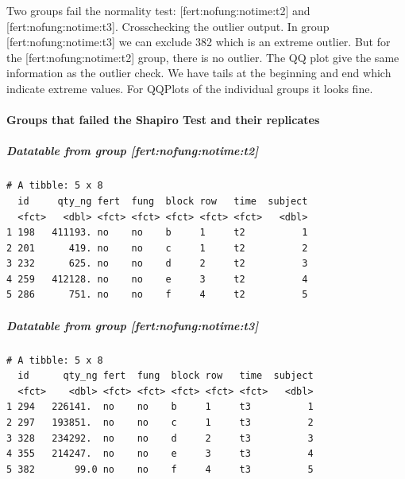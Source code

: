 \documentclass[twoside,12pt,final]{ucthesis-CA2012}
\begin{document}
\begin{ucmainmatter}
Two groups fail the normality test: {[}fert:no\textbar fung:no\textbar time:t2{]} and {[}fert:no\textbar fung:no\textbar time:t3{]}. Crosschecking the outlier output. In group {[}fert:no\textbar fung:no\textbar time:t3{]} we can exclude 382 which is an extreme outlier. But for the {[}fert:no\textbar fung:no\textbar time:t2{]} group, there is no outlier. The QQ plot give the same information as the outlier check. We have tails at the beginning and end which indicate extreme values. For QQPlots of the individual groups it looks fine.

\hypertarget{groups-that-failed-the-shapiro-test-and-their-replicates}{%
\paragraph{Groups that failed the Shapiro Test and their replicates}\label{groups-that-failed-the-shapiro-test-and-their-replicates}}

\hypertarget{datatable-from-group-fertnofungnotimet2}{%
\subparagraph{Datatable from group {[}fert:no\textbar fung:no\textbar time:t2{]}}\label{datatable-from-group-fertnofungnotimet2}}
\begin{verbatim}
# A tibble: 5 x 8
  id     qty_ng fert  fung  block row   time  subject
  <fct>   <dbl> <fct> <fct> <fct> <fct> <fct>   <dbl>
1 198   411193. no    no    b     1     t2          1
2 201      419. no    no    c     1     t2          2
3 232      625. no    no    d     2     t2          3
4 259   412128. no    no    e     3     t2          4
5 286      751. no    no    f     4     t2          5
\end{verbatim}
\hypertarget{datatable-from-group-fertnofungnotimet3}{%
\subparagraph{Datatable from group {[}fert:no\textbar fung:no\textbar time:t3{]}}\label{datatable-from-group-fertnofungnotimet3}}
\begin{verbatim}
# A tibble: 5 x 8
  id      qty_ng fert  fung  block row   time  subject
  <fct>    <dbl> <fct> <fct> <fct> <fct> <fct>   <dbl>
1 294   226141.  no    no    b     1     t3          1
2 297   193851.  no    no    c     1     t3          2
3 328   234292.  no    no    d     2     t3          3
4 355   214247.  no    no    e     3     t3          4
5 382       99.0 no    no    f     4     t3          5
\end{verbatim}
\hypertarget{section}{%
\paragraph{}\label{section}}


\end{ucmainmatter}
\end{document}
